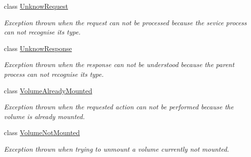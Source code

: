 \begin{DoxyCompactItemize}
class \hyperlink{class_gost_crypt_1_1_core_1_1_unknow_request}{Unknow\+Request}
\begin{DoxyCompactList}\small\item\em Exception thrown when the request can not be processed because the sevice process can not recognise its type. \end{DoxyCompactList}\item 
class \hyperlink{class_gost_crypt_1_1_core_1_1_unknow_response}{Unknow\+Response}
\begin{DoxyCompactList}\small\item\em Exception thrown when the response can not be understood because the parent process can not recognise its type. \end{DoxyCompactList}\item 
class \hyperlink{class_gost_crypt_1_1_core_1_1_volume_already_mounted}{Volume\+Already\+Mounted}
\begin{DoxyCompactList}\small\item\em Exception thrown when the requested action can not be performed because the volume is already mounted. \end{DoxyCompactList}\item 
class \hyperlink{class_gost_crypt_1_1_core_1_1_volume_not_mounted}{Volume\+Not\+Mounted}
\begin{DoxyCompactList}\small\item\em Exception thrown when trying to unmount a volume currently not mounted. \end{DoxyCompactList}\end{DoxyCompactItemize}

